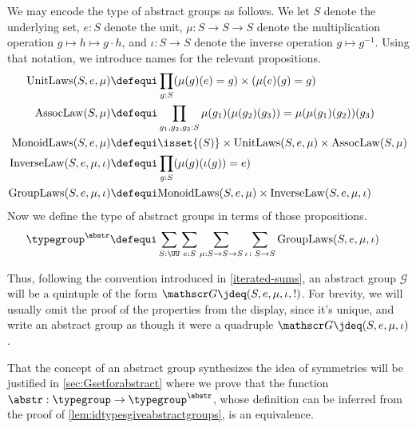 \begin{remark}
  \label{rem:typemonoidabstrgp}
  We may encode the type of abstract groups as follows.  We let $S$ denote the underlying set, $e : S$ denote the unit, $\mu:S\to S\to S$ denote
  the multiplication operation $g \mapsto h \mapsto g \cdot h$, and $\iota : S \to S$ denote the inverse operation $g \mapsto g^{-1}$.  Using
  that notation, we introduce names for the relevant propositions.
  \begin{align*}
    \mathrm{UnitLaws}(S,e,\mu)   & \defequi\prod_{g:S} (\mu{}(g)(e) = g)\times(\mu{}(e)(g) = g) \\
    \mathrm{AssocLaw}(S,\mu{})   & \defequi\prod_{g_1,g_2,g_3:S} \mu{}(g_1)(\mu{}(g_2)(g_3))=\mu{}(\mu{}(g_1)(g_2))(g_3) \\
    \mathrm{MonoidLaws}(S,e,\mu) & \defequi \isset{(S)} \times \mathrm{UnitLaws}(S,e,\mu) \times \mathrm{AssocLaw}(S,\mu{}) \\
    \mathrm{InverseLaw}(S,e,\mu,\iota) & \defequi \prod_{g:S}(\mu(g)(\iota(g)) = e) \\
    \mathrm{GroupLaws}(S,e,\mu,\iota) & \defequi \mathrm{MonoidLaws}(S,e,\mu) \times \mathrm{InverseLaw}(S,e,\mu,\iota)
  \end{align*}
  Now we define the type of abstract groups in terms of those propositions.
  \begin{align*}
    \typegroup^\abstr \defequi \sum_{S:\UU} & \sum_{e:S}\sum_{\mu{}:S\to S\to S} \sum_{\iota\colon S\to S} \mathrm{GroupLaws}(S,e,\mu,\iota)
  \end{align*}

  Thus, following the convention introduced in \cref{iterated-sums}, an abstract group $\mathscr G$ will be a quintuple of the form
  $\mathscr G \jdeq (S,e,\mu,\iota,!)$.  For brevity, we will usually omit the proof of the properties from the display, since it's unique, and write an abstract
  group as though it were a quadruple $\mathscr G \jdeq (S,e,\mu,\iota)$.
\end{remark}

\begin{remark}
  That the concept of an abstract group synthesizes the idea of symmetries will be justified in \cref{sec:Gsetforabstract} where we prove that
  the function $\abstr:\typegroup\to\typegroup^\abstr$, whose definition can be inferred from the proof of \cref{lem:idtypesgiveabstractgroups}, is an equivalence.
\end{remark}

